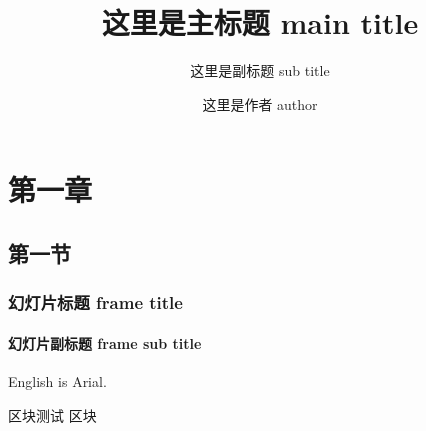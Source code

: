 \documentclass[12pt, aspectratio=169]{beamer}
\title{这里是主标题 main title}
\subtitle{这里是副标题 sub title}
\author{这里是作者 author}
\institute{这里是学院 institute}
\begin{document}
\begin{frame}
    \titlepage
\end{frame}

\section{第一章}

\subsection{第一节}

\begin{frame}[t]
    \frametitle{幻灯片标题 frame title}
    \framesubtitle{幻灯片副标题 frame sub title}

    English is Arial.

    \begin{block}{区块测试}
        区块
    \end{block}

\end{frame}
\end{document}
